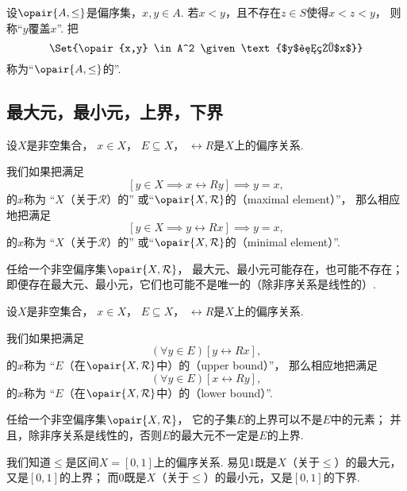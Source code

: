 \begin{definition}
设\(\opair{A,\leq}\)是偏序集，\(x,y \in A\).
若\(x < y\)，且不存在\(z \in S\)使得\(x < z < y\)，
则称“\(y\)覆盖\(x\)”.
把\[
	\Set{\opair{x,y} \in A^2 \given \text{$y$覆盖$x$}}
\]称为“\(\opair{A,\leq}\)的”.
\end{definition}

\subsection{最大元，最小元，上界，下界}
\begin{definition}
设\(X\)是非空集合，
\(x \in X\)，
\(E \subseteq X\)，
\(\rel{R}\)是\(X\)上的偏序关系.

我们如果把满足\[
	[y \in X \implies x\rel{R}y]
	\implies
	y = x,
\]的\(x\)称为
“\(X\)（关于\(\mathcal{R}\)）的”
或“\(\opair{X,\mathcal{R}}\)的（maximal element）”，
那么相应地把满足\[
	[y \in X \implies y\rel{R}x]
	\implies
	y = x,
\]的\(x\)称为
“\(X\)（关于\(\mathcal{R}\)）的”
或“\(\opair{X,\mathcal{R}}\)的（minimal element）”.
\end{definition}

任给一个非空偏序集\(\opair{X,\rel{R}}\)，
最大元、最小元可能存在，也可能不存在；
即便存在最大元、最小元，它们也可能不是唯一的（除非序关系是线性的）.

\begin{definition}
设\(X\)是非空集合，
\(x \in X\)，
\(E \subseteq X\)，
\(\rel{R}\)是\(X\)上的偏序关系.

我们如果把满足\[
	(\forall y \in E)[y\rel{R}x],
\]的\(x\)称为
“\(E\)（在\(\opair{X,\mathcal{R}}\)中）的（upper bound）”，
那么相应地把满足\[
	(\forall y \in E)[x\rel{R}y],
\]的\(x\)称为
“\(E\)（在\(\opair{X,\mathcal{R}}\)中）的（lower bound）”.
\end{definition}

任给一个非空偏序集\(\opair{X,\rel{R}}\)，
它的子集\(E\)的上界可以不是\(E\)中的元素；
并且，除非序关系是线性的，否则\(E\)的最大元不一定是\(E\)的上界.

\begin{example}
我们知道\(\leq\)是区间\(X=[0,1]\)上的偏序关系.
易见\(1\)既是\(X\)（关于\(\leq\)）的最大元，又是\([0,1]\)的上界；
而\(0\)既是\(X\)（关于\(\leq\)）的最小元，又是\([0,1]\)的下界.
\end{example}

